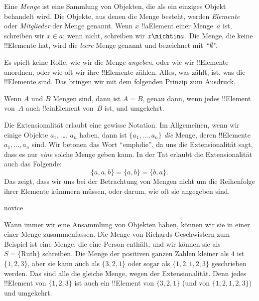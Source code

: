 \documentclass[../../../include/open-logic-section]{subfiles}
\begin{document}

Eine \emph{Menge} ist eine Sammlung von Objekten, die als ein einziges
Objekt behandelt wird. Die Objekte, aus denen die Menge besteht, werden \emph{Elemente} oder
\emph{Mitglieder} der Menge genannt. Wenn $x$ !!a{Element} einer Menge~$a$ ist,
schreiben wir $x \in a$; wenn nicht, schreiben wir $x \nichtin a$. Die Menge, die keine
!!{Element}e hat, wird die \emph{leere} Menge genannt und
bezeichnet mit~``$\emptyset$''.

\begin{explain}
Es spielt keine Rolle, wie wir die Menge \emph{angeben}, oder wie wir
\ihre !!{Element}e anordnen, oder wie oft wir
ihre !!{Element}e zählen. Alles, was zählt, ist, was die !!{Element}e
sind. Das bringen wir mit dem folgenden Prinzip zum Ausdruck.
\end{explain}

\begin{defn}[Extensionalität]
  Wenn $A$ und $B$ Mengen sind, dann ist $A = B$, genau dann, wenn
  jedes !!{Element} von~$A$ auch !!ein{Element} von~$B$ ist, und umgekehrt.
\end{defn}

Die Extensionalität erlaubt eine gewisse Notation. Im Allgemeinen, wenn wir einige
Objekte $a_{1}$, \dots, $a_{n}$ haben, dann ist $\{a_{1}, \dots, a_{n}\}$
\emph{die} Menge, deren !!{Element}e $a_1, \dots, a_n$ sind. Wir betonen das Wort ``emph{die}'', da uns die Extensionalität sagt, dass es
nur \emph{eine} solche Menge geben kann. In der Tat erlaubt die Extensionalität auch das
Folgende:
  \[
    \{a, a, b\} = \{a, b\} = \{b,a\}.
  \] 
Das zeigt, dass wir uns bei der Betrachtung von Mengen nicht um die Reihenfolge ihrer Elemente kümmern müssen, oder darum,  wie oft sie angegeben sind.

\begin{tagblock}{novice}
\begin{ex}
Wann immer wir eine Ansammlung von Objekten haben, können wir sie in einer
einer Menge zusammenfassen. Die Menge von Richards Geschwistern zum Beispiel ist eine Menge, die
eine Person enthält, und wir können sie als $S=\{\textrm{Ruth}\}$ schreiben.
Die Menge der positiven ganzen Zahlen kleiner als $4$ ist $\{1, 2, 3\}$, aber sie
kann auch als $\{3, 2, 1\}$ oder sogar als $\{1, 2, 1, 2, 3\}$ geschrieben werden.
Das sind alle die gleiche Menge, wegen der Extensionalität. Denn jedes !!{Element}
von $\{1, 2, 3\}$ ist auch ein !!{Element} von $\{3, 2, 1\}$ (und von $\{1,
2, 1, 2, 3\}$) und umgekehrt.
\end{ex} 
\end{tagblock}
\end{document}
